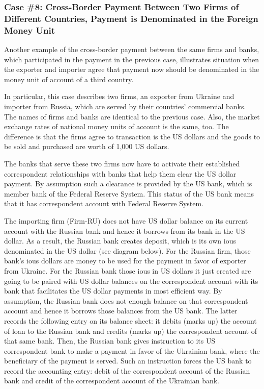 \subsubsection*{Case \#8: Cross-Border Payment Between Two Firms of Different Countries, Payment is Denominated in the Foreign Money Unit}

Another example of the cross-border payment between the same firms and banks, which participated in the payment in the previous case, illustrates situation when the exporter and importer agree that payment now should be denominated in the money unit of account of a third country.

In particular, this case describes two firms, an exporter from Ukraine and importer from Russia, which are served by their countries' commercial banks. The names of firms and banks are identical to the previous case. Also, the market exchange rates of national money units of account is the same, too. The difference is that the firms agree to transaction is the US dollars and the goods to be sold and purchased are worth of 1,000 US dollars.

The banks that serve these two firms now have to activate their established correspondent relationships with banks that help them clear the US dollar payment. By assumption such a clearance is provided by the US bank, which is member bank of the Federal Reserve System. This status of the US bank means that it has correspondent account with Federal Reserve System.

The importing firm (Firm-RU) does not have US dollar balance on its current account with the Russian bank and hence it borrows from its bank in the US dollar. As a result, the Russian bank creates deposit, which is its own \acsp{iou} denominated in the US dollar (see diagram below). For the Russian firm, those bank's \acsp{iou} dollars are money to be used for the payment in favor of exporter from Ukraine. For the Russian bank those \acsp{iou} in US dollars it just created are going to be paired with US dollar balances on the correspondent account with its bank that facilitates the US dollar payments in most efficient way. By assumption, the Russian bank does not enough balance on that correspondent account and hence it borrows those balances from the US bank. The latter records the following entry on its balance sheet: it debits (marks up) the account of loan to the Russian bank and credits (marks up) the correspondent account of that same bank. Then, the Russian bank gives instruction to its US correspondent bank to make a payment in favor of the Ukrainian bank, where the beneficiary of the payment is served. Such an instruction forces the US bank to record the accounting entry: debit of the correspondent account of the Russian bank and credit of the correspondent account of the Ukrainian bank. \par

